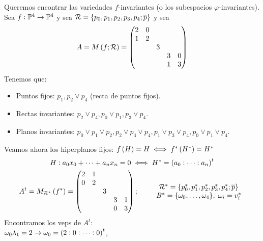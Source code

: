 \begin{example}
    Queremos encontrar las variedades $f$-invariantes (o los subespacios $\varphi$-invariantes). \\
    Sea $f:\mathbb{P}^4\to\mathbb{P}^4$ y sea $\mathcal{R} = \{p_0, p_1,p_2,p_3,p_4;\overline{p}\}$ y sea
    \[
        A = M\left( f;\mathcal{R}\right) =
        \begin{pmatrix}
            2 & 0 &   &   &   \\
            1 & 2 &   &   &   \\
              &   & 3 &   &   \\
              &   &   & 3 & 0 \\
              &   &   & 1 & 3 \\
        \end{pmatrix}
    \]
    Tenemos que:
    \begin{itemize}
        \item Puntos fijos: $p_1, p_2 \vee p_4$ (recta de puntos fijos).
        \item Rectas invariantes: $p_2 \vee p_4, p_0 \vee p_1, p_3 \vee p_4$.
        \item Planos invariantes: $p_0 \vee p_1 \vee p_2, p_2 \vee p_3 \vee p_4, p_1 \vee p_3 \vee p_4, p_0 \vee p_1 \vee p_4$.
    \end{itemize}
    Veamos ahora los hiperplanos fijos: $f\left( H\right) = H \iff f^*\left( H^*\right) = H^*$
    \begin{gather*}
        H:a_0x_0+\dots+a_nx_n=0 \iff H^* = \left( a_0:\dots:a_n\right)^t \\
        A^t= M_{\mathcal{R}^*}\left( f^*\right) = \begin{pmatrix}
            2 & 1 &   &   &   \\
            0 & 2 &   &   &   \\
              &   & 3 &   &   \\
              &   &   & 3 & 1 \\
              &   &   & 0 & 3 \\
        \end{pmatrix}; \qquad
        \begin{array}{c}
            \mathcal{R}^* = \{p_0^*,p_1^*,p_2^*,p_3^*,p_4^*;\overline{p}\} \\
            B^* = \{\omega_0,\dots,\omega_4\}, \; \omega_i = v_i^*
        \end{array}
    \end{gather*}
    Encontramos los veps de $A^t$: \\
    \indent $\omega_0 \lambda_1 = 2 \rightarrow \omega_0 = \left( 2:0:\dots:0\right)^t$, \\

\end{example}
